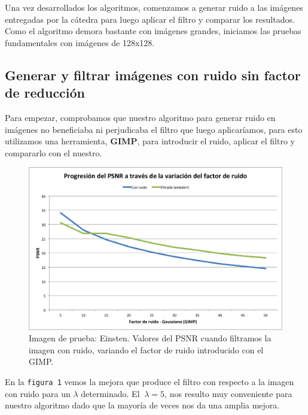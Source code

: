 \documentclass[a4paper]{article}
\begin{document}
Una vez desarrollados los algoritmos, comenzamos a generar ruido a las imágenes entregadas por la cátedra para luego aplicar el filtro y comparar los resultados. Como el algoritmo demora bastante con imágenes grandes, iniciamos las pruebas fundamentales con imágenes de 128x128. \vspace{1em}

\subsection{Generar y filtrar imágenes con ruido sin factor de reducción}

Para empezar, comprobamos que nuestro algoritmo para generar ruido en imágenes no beneficiaba ni perjudicaba el filtro que luego aplicaríamos, para esto utilizamos una herramienta, \textbf{GIMP}, para introducir el ruido, aplicar el filtro y compararlo con el nuestro.

\begin{figure}[H]
  \centering
  \includegraphics[scale=0.75]{graficos/PSNR_Einstein-GIMP.png}
  \caption{ Imagen de prueba: Einsten. Valores del PSNR cuando filtramos la imagen con ruido, variando el factor de ruido introducido con el GIMP.}
\end{figure}

En la \texttt{figura 1}  vemos la mejora que produce el filtro con respecto a la imagen con ruido para un $\lambda$ determinado. 
El $\ \lambda = 5$, nos resulto muy conveniente para nuestro algoritmo dado que la mayoría de veces nos da una amplia mejora. \\ 
\end{document}
